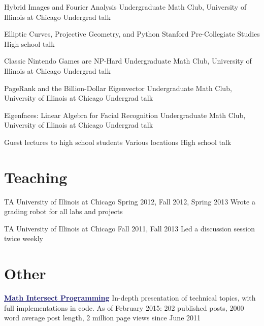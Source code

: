 \documentclass[11pt]{moderncv}
\begin{document}
         {Hybrid Images and Fourier Analysis}
      {Undergraduate Math Club, University of Illinois at Chicago}
      {Undergrad talk}
      {}
{}

         {Elliptic Curves, Projective Geometry, and Python}
      {Stanford Pre-Collegiate Studies}
      {High school talk}
      {}
{}

         {Classic Nintendo Games are NP-Hard}
      {Undergraduate Math Club, University of Illinois at Chicago}
      {Undergrad talk}
      {}
{}

         {PageRank and the Billion-Dollar Eigenvector}
      {Undergraduate Math Club, University of Illinois at Chicago}
      {Undergrad talk}
      {}
{}

         {Eigenfaces: Linear Algebra for Facial Recognition}
      {Undergraduate Math Club, University of Illinois at Chicago}
      {Undergrad talk}
      {}
{}

         {Guest lectures to high school students}
      {Various locations}
      {High school talk}
      {}
{}


   \section{Teaching}
         {TA}
      {University of Illinois at Chicago}
      {Spring 2012, Fall 2012, Spring 2013}
      {}
      {Wrote a grading robot for all labs and projects}

         {TA}
      {University of Illinois at Chicago}
      {Fall 2011, Fall 2013}
      {}
      {Led a discussion session twice weekly}


   \section{Other}
         {\href{http://jeremykun.com}{\textcolor{MidnightBlue}{\underline{\textbf{Math Intersect Programming}}}}}
      {}
      {In-depth presentation of technical topics, with full implementations in code. As of February 2015: 202 published posts, 2000 word average post length, 2 million page views since June 2011}
      {}
      {}
\end{document}
